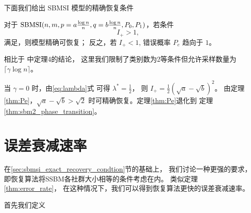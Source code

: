 下面我们给出 SBMSI 模型的精确恢复条件
	
\begin{theorem}\label{thm:Pe}
    对于 $\operatorname{SBMSI}(n,m,p=a\frac{\log n}{n},q=b\frac{\log n}{n},P_0,P_1)$，若条件
    \begin{equation}\label{eq:positive_condition}
        I_+ > 1,
    \end{equation}
    满足，则模型精确可恢复；
    反之，若 $I_+ < 1$,  错误概率 $P_e$ 趋向于 $1$。
\end{theorem}
相比于 \citet{abbe17sideinfo} 中定理4的结论，
这里我们限制了类别数为2等条件但允许采样数量为
$\lceil \gamma \log n \rceil $。

当 $\gamma=0$ 时，由\eqref{eq:lambda}式 可得 $\lambda^*=\frac{1}{2}$，
则 $I_+=\frac{1}{2}(\sqrt{a}-\sqrt{b})^2$。
由定理\ref{thm:Pe}，$\sqrt{a}-\sqrt{b} > \sqrt{2}$
时可精确恢复。定理\ref{thm:Pe}退化到
定理\ref{thm:sbm2_phase_transition}。


\section{误差衰减速率}
在\ref{sec:sbmsi_exact_recovery_condtion}节的基础上，
我们讨论一种更强的要求，即恢复算法将SSBM各社群大小相等的条件考虑在内。
类似定理\ref{thm:error_rate}，
在这种情况下，我们可以得到恢复算法更快的误差衰减速率。

首先我们定义
